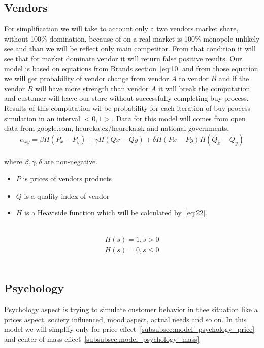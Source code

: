 \subsection{Vendors} \label{subsec:model_vendors}
For simplification we will take to account only a two vendors market share, without 100\% domination, because of on a real
market is 100\% monopole unlikely see and than we will be reflect only main competitor.
From that condition it will see that for market dominate vendor it will return false positive results.
Our model is based on equations from Brands section~\ref{eq:10} and from those equation we will get probability of vendor change from
vendor $A$ to vendor $B$ and if the vendor $B$ will have more strength than vendor $A$ it will break the computation and customer
will leave our store without successfully completing buy process.
Results of this computation wil be probability for each iteration of buy process simulation in an interval $<0,1>$. Data for this model
will comes from open data from google.com, heureka.cz/heureka.sk and national governments.
\\
\begin{equation} \label{eq:24}
\alpha_{xy} = \beta H(P_x-P_y) + \gamma H(Qx-Qy) + \delta H(Px-Py)H(Q_x - Q_y)
\end{equation}
\\
where $\beta, \gamma, \delta$ are non-negative.
\\
\begin{itemize}
    \item $P$ is prices of vendors products
    \item $Q$ is a quality index of vendor
    \item $H$ is a Heaviside function which will be calculated by~\ref{eq:22}.
\end{itemize}
\\
\begin{eqnarray} \label{eq:25}
H(s) = 1, s > 0 \\
H (s) = 0, s \leq 0
\end{eqnarray}
\\
\subsection{Psychology} \label{subsec:model_psychology}
Psychology aspect is trying to simulate customer behavior in thee situation like a prices aspect, society influenced, mood aspect, actual needs
and so on.
In this model we will simplify only for price effect~\ref{subsubsec:model_psychology_price} and center of mass effect~\ref{subsubsec:model_psychology_mass}
